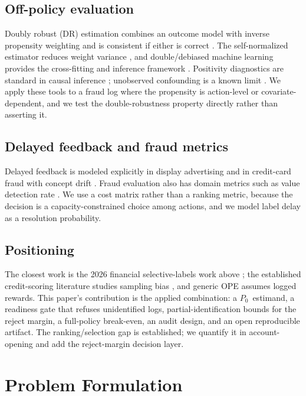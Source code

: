 \documentclass[conference]{IEEEtran}
\newcommand{\Pzero}{\ensuremath{P_0}}
\begin{document}
\subsection{Off-policy evaluation}
Doubly robust (DR) estimation combines an outcome model with inverse propensity weighting and is consistent if either is correct \cite{dudik2011dr,dudik2014dr}. The self-normalized estimator reduces weight variance \cite{swaminathan2015self}, and double/debiased machine learning provides the cross-fitting and inference framework \cite{chernozhukov2018dml}. Positivity diagnostics are standard in causal inference \cite{petersen2012positivity}; unobserved confounding is a known limit \cite{namkoong2020unobserved}. We apply these tools to a fraud log where the propensity is action-level or covariate-dependent, and we test the double-robustness property directly rather than asserting it.

\subsection{Delayed feedback and fraud metrics}
Delayed feedback is modeled explicitly in display advertising \cite{chapelle2014delayed} and in credit-card fraud with concept drift \cite{dalpozzolo2015delayed}. Fraud evaluation also has domain metrics such as value detection rate \cite{dervovic2023vdr}. We use a cost matrix rather than a ranking metric, because the decision is a capacity-constrained choice among actions, and we model label delay as a resolution probability.

\subsection{Positioning}
The closest work is the 2026 financial selective-labels work above \cite{kuroki2026oscar,bhola2026,hong2026doit}; the established credit-scoring literature studies sampling bias \cite{kozodoi2025fighting,scarone2026illusion}, and generic OPE assumes logged rewards. This paper's contribution is the applied combination: a \Pzero\ estimand, a readiness gate that refuses unidentified logs, partial-identification bounds for the reject margin, a full-policy break-even, an audit design, and an open reproducible artifact. The ranking/selection gap is established; we quantify it in account-opening and add the reject-margin decision layer.

\section{Problem Formulation}
\end{document}
